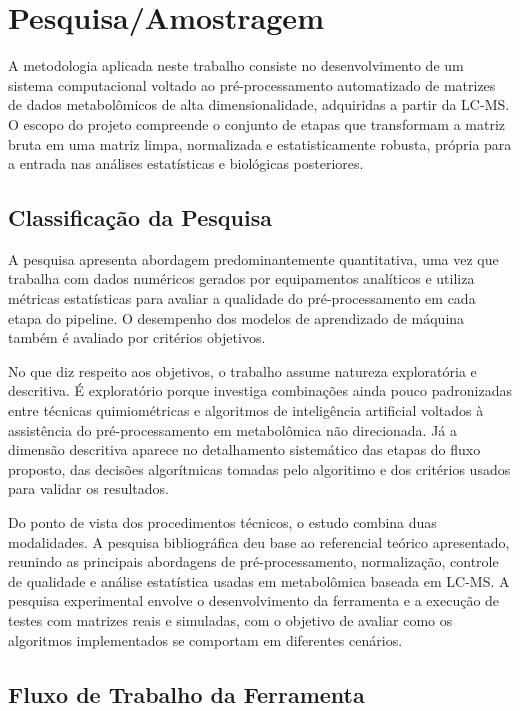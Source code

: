 % 

\chapter[Pesquisa/Amostragem]{Pesquisa/Amostragem}

A metodologia aplicada neste trabalho consiste no desenvolvimento de um sistema computacional voltado ao pré-processamento automatizado de matrizes de dados metabolômicos de alta dimensionalidade, adquiridas a partir da LC-MS. O escopo do projeto compreende o conjunto de etapas que transformam a matriz bruta em uma matriz limpa, normalizada e estatisticamente robusta, própria para a entrada nas análises estatísticas e biológicas posteriores.
 
\section{Classificação da Pesquisa}
A pesquisa apresenta abordagem predominantemente quantitativa, uma vez que trabalha com dados numéricos gerados por equipamentos analíticos e utiliza métricas estatísticas para avaliar a qualidade do pré-processamento em cada etapa do pipeline. O desempenho dos modelos de aprendizado de máquina também é avaliado por critérios objetivos. 

No que diz respeito aos objetivos, o trabalho assume natureza exploratória e descritiva. É exploratório porque investiga combinações ainda pouco padronizadas entre técnicas quimiométricas e algoritmos de inteligência artificial voltados à assistência do pré-processamento em metabolômica não direcionada. Já a dimensão descritiva aparece no detalhamento sistemático das etapas do fluxo proposto, das decisões algorítmicas tomadas pelo algoritimo e dos critérios usados para validar os resultados.
 
Do ponto de vista dos procedimentos técnicos, o estudo combina duas modalidades. A pesquisa bibliográfica deu base ao referencial teórico apresentado, reunindo as principais abordagens de pré-processamento, normalização, controle de qualidade e análise estatística usadas em metabolômica baseada em LC-MS. A pesquisa experimental envolve o desenvolvimento da ferramenta e a execução de testes com matrizes reais e simuladas, com o objetivo de avaliar como os algoritmos implementados se comportam em diferentes cenários.

\section{Fluxo de Trabalho da Ferramenta}
 
